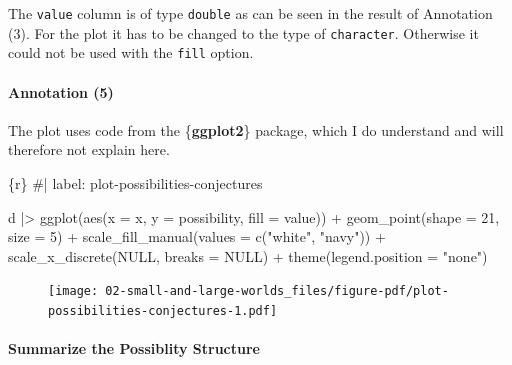 \documentclass[
  letterpaper,
  DIV=11,
  numbers=noendperiod]{scrreprt}
\let\oldparagraph\paragraph
\renewcommand{\paragraph}[1]{\oldparagraph{#1}\mbox{}}
\newenvironment{Shaded}{\begin{snugshade}}{\end{snugshade}}
\newcommand{\AttributeTok}[1]{\textcolor[rgb]{0.40,0.45,0.13}{#1}}
\newcommand{\CommentTok}[1]{\textcolor[rgb]{0.37,0.37,0.37}{#1}}
\newcommand{\ConstantTok}[1]{\textcolor[rgb]{0.56,0.35,0.01}{#1}}
\newcommand{\DecValTok}[1]{\textcolor[rgb]{0.68,0.00,0.00}{#1}}
\newcommand{\FunctionTok}[1]{\textcolor[rgb]{0.28,0.35,0.67}{#1}}
\newcommand{\InformationTok}[1]{\textcolor[rgb]{0.37,0.37,0.37}{#1}}
\newcommand{\NormalTok}[1]{\textcolor[rgb]{0.00,0.23,0.31}{#1}}
\newcommand{\SpecialCharTok}[1]{\textcolor[rgb]{0.37,0.37,0.37}{#1}}
\newcommand{\StringTok}[1]{\textcolor[rgb]{0.13,0.47,0.30}{#1}}
\begin{document}
The \texttt{value} column is of type \texttt{double} as can be seen in
the result of Annotation (3). For the plot it has to be changed to the
type of \texttt{character}. Otherwise it could not be used with the
\texttt{fill} option.

\hypertarget{annotation-5}{%
\paragraph{Annotation (5)}\label{annotation-5}}

The plot uses code from the \{\textbf{ggplot2}\} package, which I do
understand and will therefore not explain here.

\begin{Shaded}
\begin{Highlighting}[]
\InformationTok{\textasciigrave{}\textasciigrave{}\textasciigrave{}\{r\}}
\CommentTok{\#| label: plot{-}possibilities{-}conjectures}

\NormalTok{d }\SpecialCharTok{|\textgreater{}} 
  \FunctionTok{ggplot}\NormalTok{(}\FunctionTok{aes}\NormalTok{(}\AttributeTok{x =}\NormalTok{ x, }\AttributeTok{y =}\NormalTok{ possibility, }\AttributeTok{fill =}\NormalTok{ value)) }\SpecialCharTok{+} 
  \FunctionTok{geom\_point}\NormalTok{(}\AttributeTok{shape =} \DecValTok{21}\NormalTok{, }\AttributeTok{size =} \DecValTok{5}\NormalTok{) }\SpecialCharTok{+} 
  \FunctionTok{scale\_fill\_manual}\NormalTok{(}\AttributeTok{values =} \FunctionTok{c}\NormalTok{(}\StringTok{"white"}\NormalTok{, }\StringTok{"navy"}\NormalTok{)) }\SpecialCharTok{+}
  \FunctionTok{scale\_x\_discrete}\NormalTok{(}\ConstantTok{NULL}\NormalTok{, }\AttributeTok{breaks =} \ConstantTok{NULL}\NormalTok{) }\SpecialCharTok{+} 
  \FunctionTok{theme}\NormalTok{(}\AttributeTok{legend.position =} \StringTok{"none"}\NormalTok{)}
\InformationTok{\textasciigrave{}\textasciigrave{}\textasciigrave{}}
\end{Highlighting}
\end{Shaded}

\begin{figure}[H]

{\centering \texttt{[image: 02-small-and-large-worlds\_files/figure-pdf/plot-possibilities-conjectures-1.pdf]}

}

\end{figure}

\hypertarget{summarize-the-possiblity-structure}{%
\paragraph{Summarize the Possiblity
Structure}\label{summarize-the-possiblity-structure}}
\end{document}
